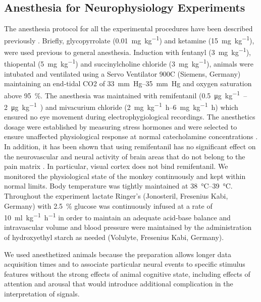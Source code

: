 \subsection{Anesthesia for Neurophysiology Experiments}
The anesthesia protocol for all the experimental procedures have been described previously \citep{Logothetis1999,Logothetis2001}.
Briefly, glycopyrrolate (\SI{0.01}{mg.{kg}^{-1}}) and ketamine (\SI{15}{mg.{kg}^{-1}}), were used previous to general anesthesia.
Induction with fentanyl (\SI{3}{mg.{kg}^{-1}}), thiopental (\SI{5}{mg.{kg}^{-1}}) and succinylcholine chloride (\SI{3}{mg.{kg}^{-1}}), animals were intubated and ventilated using a Servo Ventilator 900C (Siemens, Germany) maintaining an end-tidal CO2 of \SIrange{33}{35}{mm.Hg} and oxygen saturation above \SI{95}{\percent}.
The anesthesia was maintained with remifentanil (\SIrange{0.5}{2}{\micro\gram.kg^{-1}.\min}) and mivacurium chloride (\SIrange{2}{6}{mg.kg^{-1}.h}) which ensured no eye movement during electrophygiological recordings.
The anesthetics dosage were established by measuring stress hormones and were selected to ensure unaffected physiological response at normal catecholamine concentrations \citep{Logothetis1999}.
In addition, it has been shown that using remifentanil has no significant effect on the neurovascular and neural activity of brain areas that do not belong to the pain matrix \citep{Goense2008,Zappe2008}.
In particular, visual cortex does not bind remifentanil.
We monitored the physiological state of the monkey continuously and kept within normal limits.
Body temperature was tightly maintained at \SIrange{38}{39}{\celsius}.
Throughout the experiment lactate Ringer's (Jonosteril, Fresenius Kabi, Germany) with \SI{2.5}{\percent} glucose was continuously infused at a rate of \SI{10}{ml.kg^{-1}.h^{-1}} in order to maintain an adequate acid-base balance and intravascular volume and blood pressure were maintained by the administration of hydroxyethyl starch as needed (Volulyte, Fresenius Kabi, Germany).


We used anesthetized animals because the preparation allows longer data acquisition times and to associate particular neural events to specific stimulus features without the strong effects of animal cognitive state, including effects of attention and arousal that would introduce additional complication in the interpretation of signals.

